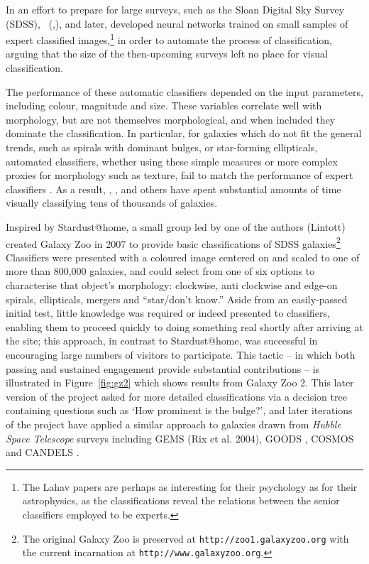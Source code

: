 \documentclass{ar2e}
\def\Fref#1{Figure~\ref{#1}\xspace}
\def\url#1{\texttt{#1}}
\begin{document}
In an effort to prepare for large surveys, such as the Sloan
Digital Sky Survey (SDSS),
\citeauthor{Lahav1995}~(\citeyear{Lahav1995},\citeyear{Lahav1996}), and later,
\citet{Ball} developed neural networks trained on small samples of expert
classified images,\footnote{The Lahav papers are perhaps as interesting for
their psychology as for their astrophysics, as the classifications reveal the
relations between the senior classifiers employed to be experts.} in order to
automate the process of classification, arguing that the size of the then-upcoming
surveys left no place for visual classification.

The performance of these automatic classifiers depended on the input parameters,
including colour, magnitude and size. These variables correlate well with
morphology, but are not themselves morphological, and when included they
dominate the classification. In particular, for galaxies which do not fit the
general trends, such as spirals with dominant bulges, or star-forming
ellipticals, automated classifiers, whether using these simple measures or
more complex proxies for morphology such as texture, fail to match the
performance of expert classifiers \citep{Lin++2008}. 
As a result, \citet{Scha2007},
\citet{Nair}, and others have spent substantial amounts of time visually
classifying tens of thousands of galaxies. 

Inspired by Stardust@home, a small group led by one of the authors (Lintott) created
Galaxy Zoo in 2007 to provide basic classifications of SDSS
galaxies\footnote{The original Galaxy Zoo is preserved at
\url{http://zoo1.galaxyzoo.org} with the current incarnation at
\url{http://www.galaxyzoo.org}.} Classifiers were presented with a coloured
image centered on and scaled to one of more than 800,000 galaxies, and could
select from one of six options to characterise that object's morphology: 
clockwise, anti clockwise and edge-on spirals,
ellipticals, mergers and ``star/don't know.'' Aside from  an easily-passed
initial test, little knowledge was required or indeed presented to classifiers,
enabling them to proceed quickly to doing something real 
shortly after arriving at the
site; this approach, in contrast to Stardust@home, was
successful in encouraging large numbers of visitors to participate. 
This tactic -- in which both passing and sustained engagement provide
substantial contributions -- is illustrated in \Fref{fig:gz2} which shows results from
Galaxy Zoo 2. This later version of the project asked for more detailed
classifications via a decision tree containing questions such as `How prominent
is the bulge?', and later iterations of the project have applied a similar
approach to galaxies drawn from \textit{Hubble Space Telescope} surveys including GEMS (Rix et al. 2004),
GOODS \citep{GOODS}, COSMOS \citep{COSMOSa,COSMOSb} and 
CANDELS \citep{CANDELSa,CANDELSb}.
\end{document}

